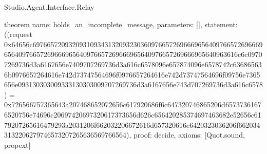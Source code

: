 \begin{lexlean}{Studio.Agent.Interface.Relay}
\begin{semanticmodule}
theorem{
  name: holds_an_incomplete_message,
  parameters: [],
  statement: ((request 0x64656c697665720932093109343132093230360976657269666965640976657269666965640976657269666965640976657269666965640976657269666965640963616c6c09707269736d3a6167656e7409707269736d3a616c6578096e657874096e6578742c636865636b0976657264616e742d73747564696f0976657264616e742d73747564696f09756e7365656e093130303009333130303009707269736d3a6167656e743d707269736d3a616c6578) = 0x726566757365643a207468652072656c617920686f6c647320746865206d65737361676520756e74696c20697420697320617373656d626c656420285374697463682e52656c6179207265616479293a2031206f662032206672616d657320616e6420323036206f6620343132206279746573207265636569766564),
  proof: decide{},
  axioms: [Quot.sound, propext]
}
\end{semanticmodule}
\end{lexlean}
